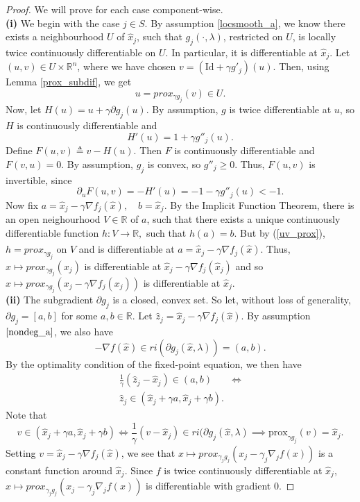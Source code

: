 \documentclass[11pt, twoside]{report}
\begin{document}
\begin{proof}
We will prove for each case component-wise. \\
\textbf{(i)} We begin with the case $j \in S.$
By assumption \ref{locsmooth_a}, we know there exists a neighbourhood $U$ of $\hat{x}_j$, such that $g_j(\cdot, \lambda)$, restricted on $U$, is locally twice continuously differentiable on $U$. In particular, it is differentiable at $\hat{x}_j$. Let $(u,v) \in U \times \mathbb{R}^n$, where we have chosen $v = (\mathrm{Id} + \gamma g'_j)(u).$ Then, using Lemma \ref{prox_subdif}, we get
\begin{equation} \label{uv_prox}
    u = prox_{\gamma g_j}(v) \in U.
\end{equation}
Now, let $H(u) = u + \gamma\partial g_j(u).$ By assumption, $g$ is twice differentiable at $u$, so $H$ is continuously differentiable and
\[H'(u) = 1 + \gamma g''_j(u).\]
Define $F(u,v) \triangleq v - H(u).$ Then $F$ is continuously differentiable and $F(v,u) = 0$. By assumption, $g_j$ is convex, so $g''_j \geq 0$. Thus, $F(u,v)$ is invertible, since 
\[\partial_u F(u,v) = - H'(u) = -1 - \gamma g''_j(u) < -1.\]
Now fix $a =  \hat{x}_j - \gamma \nabla f_j(\hat{x}), \quad b =\hat{x}_j.$ By the Implicit Function Theorem, there is an open neighourhood $V \in \mathbb{R}$ of $a$, such that there exists a unique continuously differentiable function $h:V \xrightarrow[]{} \mathbb{R},$ such that $h(a) = b.$ But by (\ref{uv_prox}), $h = prox_{\gamma g_j}$ on $V$ and is differentiable at $a = \hat{x}_j - \gamma \nabla f_j(\hat{x}).$ Thus, $x \mapsto prox_{\gamma g_j}(x_j)$ is differentiable at $\hat{x}_j - \gamma \nabla f_j(\hat{x}_j)$ and so $x \mapsto prox_{\gamma g_j}(x_j - \gamma \nabla f_j(x_j))$ is differentiable at $\hat{x}_j$.\\
\textbf{(ii)}
The subgradient $\partial g_j$ is a closed, convex set. So let, without loss of generality, $\partial g_j = [a,b]$ for some $a,b \in \mathbb{R}$. Let $\hat{z}_j = \hat{x}_j - \gamma \nabla f_j(\hat{x})$. By assumption $\ref{nondeg_a}$, we also have
\[-\nabla f(\hat{x}) \in ri(\partial g_j(\hat{x},\lambda)) = (a,b).\]
By the optimality condition of the fixed-point equation, we then have
\begin{align*}
    \frac{1}{\gamma}(\hat{z}_j - \hat{x}_j) \in (a,b) &\iff \\
    \hat{z}_j \in (\hat{x}_j+ \gamma a,\hat{x}_j+ \gamma b).
\end{align*}
Note that 
$$v \in (\hat{x}_j+ \gamma a,\hat{x}_j+ \gamma b) \iff \frac{1}{\gamma}(v - \hat{x}_j) \in ri(\partial g_j(\hat{x},\lambda) \implies \mathrm{prox}_{\gamma g_j}(v) = \hat{x}_j.$$
Setting $v = \hat{x}_j - \gamma \nabla f_j(\hat{x})$, we see that $x \mapsto prox_{\gamma_j g_j}(x_j - \gamma_j \nabla_j f(x))$ is a constant function around $\hat{x}_j.$ Since $f$ is twice continuously differentiable at $\hat{x}_j$, $x \mapsto prox_{\gamma_j g_j}(x_j - \gamma_j \nabla_j f(x))$ is differentiable with gradient 0.

\end{proof}
\end{document}
